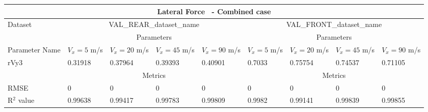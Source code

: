         \begin{tabular}{lllll|llll} \hline \multicolumn{9}{c}{Lateral Force~ - Combined case}                                                                                                                                                                        \\ \hline Dataset                         & \multicolumn{4}{c|}{VAL\_REAR\_dataset\_name}                                                & \multicolumn{4}{c}{VAL\_FRONT\_dataset\_name}                                                     \\ \hline \multicolumn{1}{c}{}            & \multicolumn{4}{c|}{Parameters}                                                              & \multicolumn{4}{c}{Parameters}                                                                    \\ \hline Parameter Name                  & $V_x = 5$ m/s     & $V_x = 20$ m/s     & $V_x = 45$ m/s     & $V_x = 90$ m/s     & $V_x = 5$ m/s      & $V_x = 20$ m/s      & $V_x = 45$ m/s      & $V_x = 90$ m/s       \\ rVy3                            & 0.31918 & 0.37964 & 0.39393 & 0.40901 & 0.7033 & 0.75754 & 0.74537 & 0.71105  \\ \hline \multicolumn{1}{c|}{}           & \multicolumn{4}{c|}{Metrics}                                                                 & \multicolumn{4}{c}{Metrics}                                                                       \\ \hline RMSE                            & 0 & 0 & 0 & 0 & 0 & 0 & 0 & 0  \\ R$^2$ value                       & 0.99638   & 0.99417   & 0.99783   & 0.99809   & 0.9982   & 0.99141   & 0.99839   & 0.99855    \\ \hline \end{tabular} 